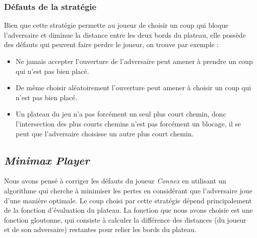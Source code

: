 \documentclass[a4paper, 12pt]{article}
\begin{document}
\subsubsection{Défauts de la stratégie}
Bien que cette stratégie permette au joueur de choisir un coup qui bloque l'adversaire et diminue la distance entre les deux bords du plateau, elle possède des défauts qui peuvent faire perdre le joueur, on trouve par exemple :
\begin{itemize}
\item Ne jamais accepter l'ouverture de l'adversaire peut amener à prendre un coup qui n'est pas bien placé.
\item De même choisir aléatoirement l'ouverture peut amener à choisir un coup qui n'est pas bien placé.
\item Un plateau du jeu n'a pas forcément un seul plus court chemin, donc l'intersection des plus courts chemins n'est pas forcément un blocage, il se peut que l'adversaire choisisse un autre plus court chemin.
\end{itemize}

\subsection{\emph{Minimax Player}}
Nous avons pensé à corriger les défauts du joueur \emph{Connex} en utilisant un algorithme qui cherche à minimiser les pertes en considérant que l'adversaire joue d'une manière optimale.
Le coup choisi par cette stratégie dépend principalement de la fonction d'évaluation du plateau. La fonction que nous avons choisie est une fonction gloutonne, qui consiste à calculer la différence des distances (du joueur et de son adversaire) restantes pour relier les bords du plateau.
\end{document}
